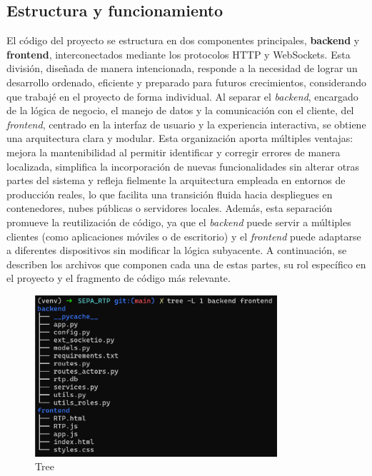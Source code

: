 \subsection{Estructura y funcionamiento}
\label{subsec:Estructura}
El código del proyecto se estructura en dos componentes principales, \textbf{backend} y \textbf{frontend}, interconectados mediante los protocolos HTTP y WebSockets. Esta división, diseñada de manera intencionada, responde a la necesidad de lograr un desarrollo ordenado, eficiente y preparado para futuros crecimientos, considerando que trabajé en el proyecto de forma individual. Al separar el \textit{backend}, encargado de la lógica de negocio, el manejo de datos y la comunicación con el cliente, del \textit{frontend}, centrado en la interfaz de usuario y la experiencia interactiva, se obtiene una arquitectura clara y modular. Esta organización aporta múltiples ventajas: mejora la mantenibilidad al permitir identificar y corregir errores de manera localizada, simplifica la incorporación de nuevas funcionalidades sin alterar otras partes del sistema y refleja fielmente la arquitectura empleada en entornos de producción reales, lo que facilita una transición fluida hacia despliegues en contenedores, nubes públicas o servidores locales. Además, esta separación promueve la reutilización de código, ya que el \textit{backend} puede servir a múltiples clientes (como aplicaciones móviles o de escritorio) y el \textit{frontend} puede adaptarse a diferentes dispositivos sin modificar la lógica subyacente. A continuación, se describen los archivos que componen cada una de estas partes, su rol específico en el proyecto y el fragmento de código más relevante.

\begin{figure}[H]
  \centering
  \includegraphics[width=0.8\textwidth]{Imagenes/treeB.png}
  \caption{Tree}
  \label{fig:Tree}
\end{figure}

